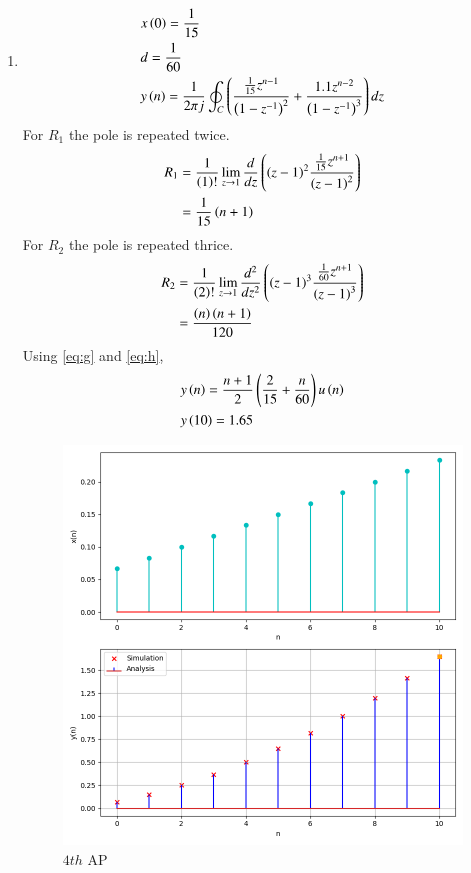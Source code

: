 \documentclass[journal,12pt,twocolumn]{IEEEtran}
\theoremstyle{remark}
\begin{document}
\begin{enumerate}[label=(\alph*)]
\item \begin{align}
        &x\left(0\right)=\frac{1}{15} \\
        &d=\frac{1}{60} \\
        &y\left(n\right)=\frac{1}{2\pi j}\oint_{C}\left(\dfrac{\frac{1}{15}z^{n-1}}{\left(1-z^{-1}\right)^2} + \dfrac{1.1z^{n-2}}{\left(1-z^{-1}\right)^{3}}\right)dz
    \end{align}
    For $R_1$ the pole is repeated twice.
\begin{align}
    R_1&=\frac{1}{\left(1\right)!}\lim\limits_{z\to 1}\frac{d}{dz}\left({\left(z-1\right)}^{2}\frac{\frac{1}{15}z^{n+1}}{{\left(z-1\right)}^2}\right)\\
    &=\frac{1}{15}\left(n+1\right)\label{eq:g}
\end{align}
    For $R_2$ the pole is repeated thrice.
\begin{align}
    R_2&=\frac{1}{\left(2\right)!}\lim\limits_{z\to 1}\frac{d^{2}}{dz^{2}}\left({\left(z-1\right)}^{3}\frac{\frac{1}{60}z^{n+1}}{{\left(z-1\right)}^3}\right)\\
    &=\frac{\left(n\right)\left(n+1\right)}{120}\label{eq:h}
\end{align}
Using \eqref{eq:g} and \eqref{eq:h},
\begin{align}
    &y\left(n\right)=\dfrac{n+1}{2}\left(\frac{2}{15}+\frac{n}{60}\right)u\left(n\right)\\
    &y\left(10\right)=1.65
\end{align}
\begin{figure}[h!]
        \centering
        \includegraphics[width=\columnwidth]{figs/plt4.png}
        \caption{$4th$ AP}
    \end{figure}
\end{enumerate}
\end{document}
